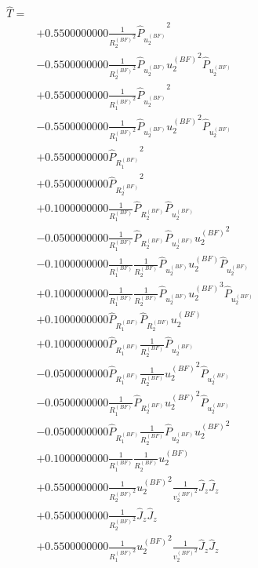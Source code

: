 \documentclass[10pt]{article}
\begin{document}
\begin{align*}
 \hat{T}  = {} \\
     & +0.5500000000 \frac{1}{{R_2^{(BF)}}^{2}} {\hat{P}_{u_2^{(BF)}}}^{2} \\
     & -0.5500000000 \frac{1}{{R_2^{(BF)}}^{2}} {\hat{P}_{u_2^{(BF)}}} {u_2^{(BF)}}^{2} {\hat{P}_{u_2^{(BF)}}} \\
     & +0.5500000000 \frac{1}{{R_1^{(BF)}}^{2}} {\hat{P}_{u_2^{(BF)}}}^{2} \\
     & -0.5500000000 \frac{1}{{R_1^{(BF)}}^{2}} {\hat{P}_{u_2^{(BF)}}} {u_2^{(BF)}}^{2} {\hat{P}_{u_2^{(BF)}}} \\
     & +0.5500000000 {\hat{P}_{R_1^{(BF)}}}^{2} \\
     & +0.5500000000 {\hat{P}_{R_2^{(BF)}}}^{2} \\
     & +0.1000000000 \frac{1}{{R_1^{(BF)}}} {\hat{P}_{R_2^{(BF)}}} {\hat{P}_{u_2^{(BF)}}} \\
     & -0.0500000000 \frac{1}{{R_1^{(BF)}}} {\hat{P}_{R_2^{(BF)}}} {\hat{P}_{u_2^{(BF)}}} {u_2^{(BF)}}^{2} \\
     & -0.1000000000 \frac{1}{{R_1^{(BF)}}} \frac{1}{{R_2^{(BF)}}} {\hat{P}_{u_2^{(BF)}}} {u_2^{(BF)}} {\hat{P}_{u_2^{(BF)}}} \\
     & +0.1000000000 \frac{1}{{R_1^{(BF)}}} \frac{1}{{R_2^{(BF)}}} {\hat{P}_{u_2^{(BF)}}} {u_2^{(BF)}}^{3} {\hat{P}_{u_2^{(BF)}}} \\
     & +0.1000000000 {\hat{P}_{R_1^{(BF)}}} {\hat{P}_{R_2^{(BF)}}} {u_2^{(BF)}} \\
     & +0.1000000000 {\hat{P}_{R_1^{(BF)}}} \frac{1}{{R_2^{(BF)}}} {\hat{P}_{u_2^{(BF)}}} \\
     & -0.0500000000 {\hat{P}_{R_1^{(BF)}}} \frac{1}{{R_2^{(BF)}}} {u_2^{(BF)}}^{2} {\hat{P}_{u_2^{(BF)}}} \\
     & -0.0500000000 \frac{1}{{R_1^{(BF)}}} {\hat{P}_{R_2^{(BF)}}} {u_2^{(BF)}}^{2} {\hat{P}_{u_2^{(BF)}}} \\
     & -0.0500000000 {\hat{P}_{R_1^{(BF)}}} \frac{1}{{R_2^{(BF)}}} {\hat{P}_{u_2^{(BF)}}} {u_2^{(BF)}}^{2} \\
     & +0.1000000000 \frac{1}{{R_1^{(BF)}}} \frac{1}{{R_2^{(BF)}}} {u_2^{(BF)}} \\
     & +0.5500000000 \frac{1}{{R_2^{(BF)}}^{2}} {u_2^{(BF)}}^{2} \frac{1}{{v_2^{(BF)}}^{2}} {\hat{J}_z} {\hat{J}_z} \\
     & +0.5500000000 \frac{1}{{R_2^{(BF)}}^{2}} {\hat{J}_z} {\hat{J}_z} \\
     & +0.5500000000 \frac{1}{{R_1^{(BF)}}^{2}} {u_2^{(BF)}}^{2} \frac{1}{{v_2^{(BF)}}^{2}} {\hat{J}_z} {\hat{J}_z} \\

\end{align*}
\end{document}
